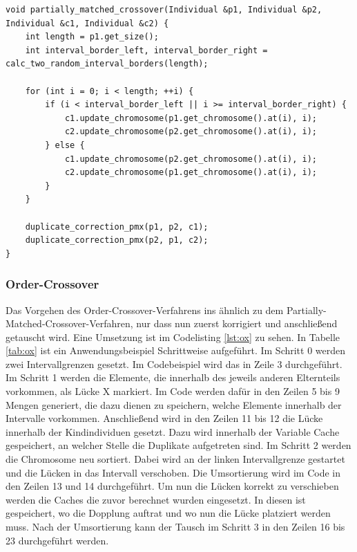 \begin{minipage}{\linewidth}
\begin{lstlisting}[caption={Partially-Matched-Crossover}, firstnumber=1, captionpos=b, label=lst:pmx]
void partially_matched_crossover(Individual &p1, Individual &p2, Individual &c1, Individual &c2) { 
	int length = p1.get_size();
	int interval_border_left, interval_border_right = calc_two_random_interval_borders(length);

	for (int i = 0; i < length; ++i) {
		if (i < interval_border_left || i >= interval_border_right) {
			c1.update_chromosome(p1.get_chromosome().at(i), i);
			c2.update_chromosome(p2.get_chromosome().at(i), i);
		} else {
			c1.update_chromosome(p2.get_chromosome().at(i), i);
			c2.update_chromosome(p1.get_chromosome().at(i), i);
		}
	}

	duplicate_correction_pmx(p1, p2, c1);
	duplicate_correction_pmx(p2, p1, c2);
}
\end{lstlisting}
\end{minipage}
\subsubsection{Order-Crossover}

Das Vorgehen des Order-Crossover-Verfahrens ins ähnlich zu dem Partially-Matched-Crossover-Verfahren, nur dass nun zuerst korrigiert und anschließend getauscht wird.
Eine Umsetzung ist im Codelisting \ref{lst:ox} zu sehen. In Tabelle \ref{tab:ox} ist ein Anwendungsbeispiel Schrittweise aufgeführt. Im Schritt 0 werden zwei Intervallgrenzen gesetzt. Im Codebeispiel wird das in Zeile 3 durchgeführt.
Im Schritt 1 werden die Elemente, die innerhalb des jeweils anderen Elternteils vorkommen, als Lücke X markiert. Im Code werden dafür in den Zeilen 5 bis 9 Mengen generiert, die dazu dienen zu speichern, welche Elemente innerhalb der Intervalle vorkommen.
Anschließend wird in den Zeilen 11 bis 12 die Lücke innerhalb der Kindindividuen gesetzt. Dazu wird innerhalb der Variable Cache gespeichert, an welcher Stelle die Duplikate aufgetreten sind. Im Schritt 2 werden die Chromosome neu sortiert. Dabei wird an der linken Intervallgrenze gestartet und die Lücken in das Intervall verschoben. Die Umsortierung wird im Code in den Zeilen 13 und 14 durchgeführt. Um nun die Lücken korrekt zu verschieben werden die Caches die zuvor berechnet wurden eingesetzt. In diesen ist gespeichert, wo die Dopplung auftrat und wo nun die Lücke platziert werden muss.
Nach der Umsortierung kann der Tausch im Schritt 3 in den Zeilen 16 bis 23 durchgeführt werden.

